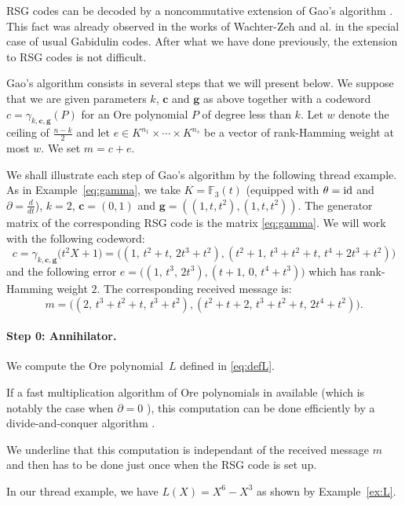 \documentclass[a4paper]{llncs}
\newcommand{\FF}{\mathbb F}
\newcommand{\id}{\textrm{\rm id}}
\newcommand{\bc}{\textbf{c}}
\newcommand{\bg}{\textbf{g}}
\begin{document}
RSG codes can be decoded by a noncommutative extension of Gao's 
algorithm \cite{gao}. This fact was already observed in the works of 
Wachter-Zeh and al. \cite{wachter} in the special case of usual Gabidulin
codes. After what we have done previously, the extension to RSG codes 
is not difficult.

Gao's algorithm consists in several steps that we will 
present below. We suppose that we are given parameters $k$, $\bc$ and
$\bg$ as above together with a codeword $c = \gamma_{k,\bc,\bg}(P)$
for an Ore polynomial $P$ of degree less than $k$. 
Let $w$ denote the ceiling of $\frac{n-k}2$ and 
let $e \in K^{n_1} \times \cdots \times K^{n_s}$ be 
a vector of rank-Hamming weight at most $w$. We set $m = c + e$.

{\small
\begin{example}
We shall illustrate each step of Gao's algorithm by the following 
thread example. As
in Example~\ref{eq:gamma}, we take $K = \FF_3(t)$ (equipped with 
$\theta = \id$ and $\partial = \frac d{dt}$), $k = 2$, $\bc = (0,1)$
and $\bg = ((1,t,t^2),(1,t,t^2))$. The generator matrix of
the corresponding RSG code is the matrix \eqref{eq:gamma}.
We will work with the following codeword:
$$c = \gamma_{k,\bc,\bg}\big(t^2 X + 1\big)
    = \big((1,\,t^2{+}t,\,2t^3{+}t^2), (t^2{+}1,\,t^3{+}t^2{+}t,\,t^4{+}2t^3{+}t^2)\big)$$
and the following error $e = \big((1,\,t^3,\,2t^3), (t{+}1,\,0,\,t^4{+}t^3)\big)$
which has rank-Hamming weight $2$. The corresponding received message is:
$$m = \big(
(2,\,t^3{+}t^2{+}t,\,t^3{+}t^2), (t^2{+}t{+}2,\,t^3{+}t^2{+}t,\,2t^4{+}t^2)\big).$$
\end{example}}

\paragraph{Step 0: Annihilator.}

We compute the Ore polynomial~$L$ defined in \eqref{eq:defL}.

\noindent
If a fast multiplication algorithm of Ore polynomials in available
(which is notably the case when $\partial = 0$ \cite{pushwach,carleb}), 
this computation can be done efficiently by a divide-and-conquer
algorithm \cite{carleb}.

We underline that this computation is independant of the received
message $m$ and then has to be done just once when the RSG code is 
set up.

{\small
\begin{example}
In our thread example, we have $L(X) = X^6 - X^3$ as shown by
Example~\ref{ex:L}.
\end{example}}
\end{document}
